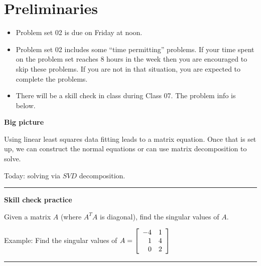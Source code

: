\documentclass[12pt,letterpaper,noanswers]{exam}
\begin{document}
 \pdfpageheight 11in 
  \pdfpagewidth 8.5in


  
\section{Preliminaries}
\begin{itemize}
\itemsep0pt
\item Problem set 02 is due on Friday at noon.
\item Problem set 02 includes some ``time permitting'' problems.  If your time spent on the problem set reaches 8 hours in the week then you are encouraged to skip these problems.  If you are not in that situation, you are expected to complete the problems.
\item There will be a skill check in class during Class 07.  The problem info is below.
\end{itemize}



\noindent\textbf{Big picture}

Using linear least squares data fitting leads to a matrix equation.  Once that is set up, we can construct the normal equations or can use matrix decomposition to solve.

Today: solving via $SVD$ decomposition.

\vspace{0.2cm}
\hrule
\vspace{0.2cm}
\noindent \textbf{Skill check practice}
\begin{questions}
\item Given a matrix $A$ (where $A^TA$ is diagonal), find the singular values of $A$.

Example: Find the singular values of $A = \left[\begin{array}{r r}
-4 & 1 \\
1 & 4 \\
0 & 2
\end{array}\right]$

\end{questions}


\vspace{0.2cm}
\hrule
\vspace{0.2cm}
\end{document}
